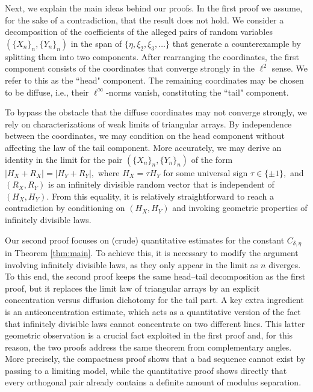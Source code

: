 \documentclass[11pt]{amsart}
\numberwithin{equation}{section}
\theoremstyle{definition}
\theoremstyle{remark}
\begin{document}
Next, we explain the main ideas behind our proofs. In the first proof we assume, for the sake of a contradiction, that the result does not hold.  We consider a  decomposition of the coefficients of the alleged pairs of random variables $(\{X_n\}_n, \{Y_n\}_n)$ in the span of $\{\eta,\xi_2,\xi_3,\dots\}$ that generate a counterexample  by splitting them into two components. After rearranging the coordinates, the first component consists of the coordinates that converge strongly in the $\ell^2$ sense. We refer to this as the ``head" component. The remaining coordinates may be chosen to be diffuse, i.e., their $\ell^{\infty}$-norms vanish,  constituting the ``tail" component. 

To bypass the obstacle that the diffuse coordinates may not converge strongly, we rely on characterizations of weak limits of triangular arrays. By independence between the coordinates, we may condition on the head component without affecting the law of the tail component. More accurately, we may derive an identity in the limit for the pair $(\{X_n\}_n, \{Y_n\}_n)$ of the form $|H_X + R_X| = |H_Y + R_Y|,$ where $H_X = \tau H_Y$ for some universal sign $\tau \in \{\pm1\},$ and $(R_X,R_Y)$ is an infinitely divisible random vector that is  independent of $(H_X,H_Y)$. From this equality, it is relatively straightforward to reach a contradiction by conditioning on $(H_X,H_Y)$ and invoking geometric properties of infinitely divisible laws.

Our second proof focuses on (crude) quantitative estimates for the constant $C_{\delta,\eta}$ in Theorem \ref{thm:main}. To achieve this, it is necessary  to modify the argument involving infinitely divisible laws, as they only appear in the limit as $n$ diverges. To this end, the second proof keeps the same head--tail decomposition as the first proof, but it replaces the limit law of triangular arrays  by an
explicit concentration versus diffusion dichotomy for the tail part. A key extra ingredient is an anticoncentration estimate, which acts as a quantitative version of the fact that infinitely divisible laws cannot concentrate on two different lines. This latter geometric observation is a crucial fact exploited in the first proof and, for this reason, the two proofs address
the same theorem from complementary angles. More precisely, the compactness proof shows that a
bad sequence cannot exist by passing to a limiting model, while the quantitative proof
shows directly that every orthogonal pair already contains a definite amount of
modulus separation.
\end{document}

